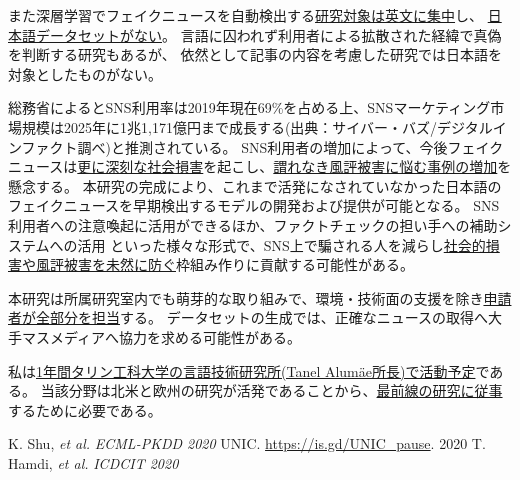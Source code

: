また深層学習でフェイクニュースを自動検出する\underline{研究対象は英文に集中}し、
\underline{日本語データセットがない}。
言語に囚われず利用者による拡散された経緯で真偽を判断する研究もあるが\cite{tarek2020}、
依然として記事の内容を考慮した研究では日本語を対象としたものがない。

総務省によるとSNS利用率は2019年現在69\%を占める上、SNSマーケティング市場規模は2025年に1兆1,171億円まで成長する(出典：サイバー・バズ/デジタルインファクト調べ)と推測されている。
SNS利用者の増加によって、今後フェイクニュースは\underline{更に深刻な社会損害}を起こし、\underline{謂れなき風評被害に悩む事例の増加}を懸念する。
本研究の完成により、これまで活発になされていなかった日本語のフェイクニュースを早期検出するモデルの開発および提供が可能となる。
SNS利用者への注意喚起に活用ができるほか、ファクトチェックの担い手への補助システムへの活用
といった様々な形式で、SNS上で騙される人を減らし\underline{社会的損害や風評被害を未然に防ぐ}枠組み作りに貢献する可能性がある。


本研究は所属研究室内でも萌芽的な取り組みで、環境・技術面の支援を除き\underline{申請者が全部分を担当}する。
データセットの生成では、正確なニュースの取得へ大手マスメディアへ協力を求める可能性がある。

私は\underline{1年間タリン工科大学の言語技術研究所(Tanel Alumäe所長)で活動予定}である。
当該分野は北米と欧州の研究が活発であることから、\underline{最前線の研究に従事}するために必要である。

{\footnotesize 
\begin{twobibliography}{99}
    \setlength{\parskip}{0cm}
    \setlength{\itemsep}{0cm}
     K. Shu, \textit{et al.} \textit{ECML-PKDD 2020}
     UNIC. \url{https://is.gd/UNIC_pause}. 2020
     T. Hamdi, \textit{et al.} \textit{ICDCIT 2020}
\end{twobibliography}
}


